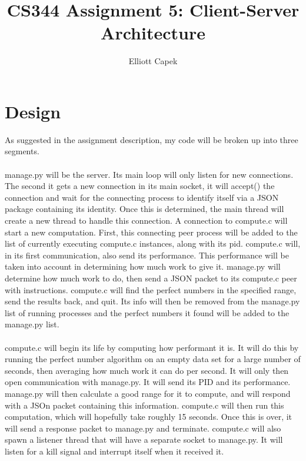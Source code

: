 \documentclass[11pt]{article}
\begin{document}
\title{CS344 Assignment 5: Client-Server Architecture}
\author{Elliott Capek}
\maketitle

\section{Design}
As suggested in the assignment description, my code will be broken up into three segments.\\ \\
manage.py will be the server. Its main loop will only listen for new connections. The second it gets a new connection in its main socket, it will accept() the connection and wait for the connecting process to identify itself via a JSON package containing its identity. Once this is determined, the main thread will create a new thread to handle this connection. A connection to compute.c will start a new computation. First, this connecting peer process will be added to the list of currently executing compute.c instances, along with its pid. compute.c will, in its first communication, also send its performance. This performance will be taken into account in determining how much work to give it. manage.py will determine how much work to do, then send a JSON packet to its compute.c peer with instructions. compute.c will find the perfect numbers in the specified range, send the results back, and quit. Its info will then be removed from the manage.py list of running processes and the perfect numbers it found will be added to the manage.py list.\\ \\
compute.c will begin its life by computing how performant it is. It will do this by running the perfect number algorithm on an empty data set for a large number of seconds, then averaging how much work it can do per second. It will only then open communication with manage.py. It will send its PID and its performance. manage.py will then calculate a good range for it to compute, and will respond with a JSOn packet containing this information. compute.c will then run this computation, which will hopefully take roughly 15 seconds. Once this is over, it will send a response packet to manage.py and terminate. compute.c will also spawn a listener thread that will have a separate socket to manage.py. It will listen for a kill signal and interrupt itself when it received it.\\ \\
\end{document}
